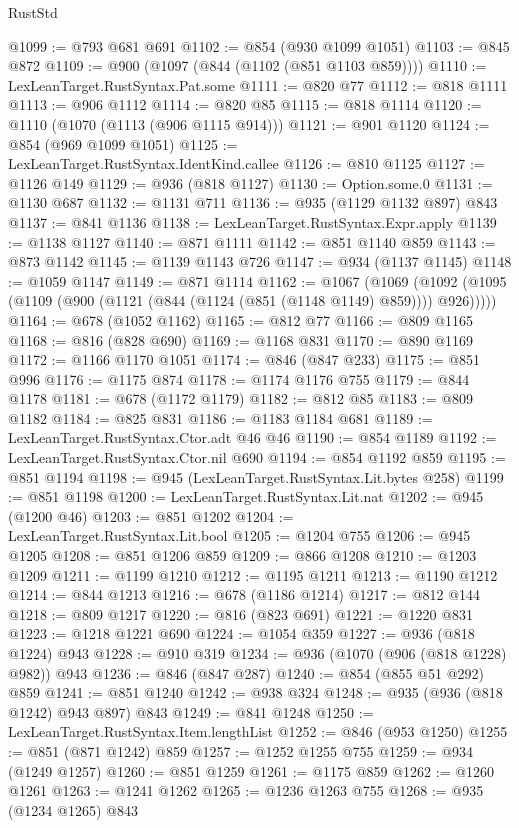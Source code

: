 \begin{lexlean}{RustStd}
\begin{coremodule}
@1099 := @793 @681 @691
@1102 := @854 (@930 @1099 @1051)
@1103 := @845 @872
@1109 := @900 (@1097 (@844 (@1102 (@851 @1103 @859))))
@1110 := LexLeanTarget.RustSyntax.Pat.some
@1111 := @820 @77
@1112 := @818 @1111
@1113 := @906 @1112
@1114 := @820 @85
@1115 := @818 @1114
@1120 := @1110 (@1070 (@1113 (@906 @1115 @914)))
@1121 := @901 @1120
@1124 := @854 (@969 @1099 @1051)
@1125 := LexLeanTarget.RustSyntax.IdentKind.callee
@1126 := @810 @1125
@1127 := @1126 @149
@1129 := @936 (@818 @1127)
@1130 := Option.some.{0}
@1131 := @1130 @687
@1132 := @1131 @711
@1136 := @935 (@1129 @1132 @897) @843
@1137 := @841 @1136
@1138 := LexLeanTarget.RustSyntax.Expr.apply
@1139 := @1138 @1127
@1140 := @871 @1111
@1142 := @851 @1140 @859
@1143 := @873 @1142
@1145 := @1139 @1143 @726
@1147 := @934 (@1137 @1145)
@1148 := @1059 @1147
@1149 := @871 @1114
@1162 := @1067
    (@1069 (@1092 (@1095 (@1109 (@900 (@1121 (@844 (@1124 (@851 (@1148 @1149) @859)))) @926)))))
@1164 := @678 (@1052 @1162)
@1165 := @812 @77
@1166 := @809 @1165
@1168 := @816 (@828 @690)
@1169 := @1168 @831
@1170 := @890 @1169
@1172 := @1166 @1170 @1051
@1174 := @846 (@847 @233)
@1175 := @851 @996
@1176 := @1175 @874
@1178 := @1174 @1176 @755
@1179 := @844 @1178
@1181 := @678 (@1172 @1179)
@1182 := @812 @85
@1183 := @809 @1182
@1184 := @825 @831
@1186 := @1183 @1184 @681
@1189 := LexLeanTarget.RustSyntax.Ctor.adt @46 @46
@1190 := @854 @1189
@1192 := LexLeanTarget.RustSyntax.Ctor.nil @690
@1194 := @854 @1192 @859
@1195 := @851 @1194
@1198 := @945 (LexLeanTarget.RustSyntax.Lit.bytes @258)
@1199 := @851 @1198
@1200 := LexLeanTarget.RustSyntax.Lit.nat
@1202 := @945 (@1200 @46)
@1203 := @851 @1202
@1204 := LexLeanTarget.RustSyntax.Lit.bool
@1205 := @1204 @755
@1206 := @945 @1205
@1208 := @851 @1206 @859
@1209 := @866 @1208
@1210 := @1203 @1209
@1211 := @1199 @1210
@1212 := @1195 @1211
@1213 := @1190 @1212
@1214 := @844 @1213
@1216 := @678 (@1186 @1214)
@1217 := @812 @144
@1218 := @809 @1217
@1220 := @816 (@823 @691)
@1221 := @1220 @831
@1223 := @1218 @1221 @690
@1224 := @1054 @359
@1227 := @936 (@818 @1224) @943
@1228 := @910 @319
@1234 := @936 (@1070 (@906 (@818 @1228) @982)) @943
@1236 := @846 (@847 @287)
@1240 := @854 (@855 @51 @292) @859
@1241 := @851 @1240
@1242 := @938 @324
@1248 := @935 (@936 (@818 @1242) @943 @897) @843
@1249 := @841 @1248
@1250 := LexLeanTarget.RustSyntax.Item.lengthList
@1252 := @846 (@953 @1250)
@1255 := @851 (@871 @1242) @859
@1257 := @1252 @1255 @755
@1259 := @934 (@1249 @1257)
@1260 := @851 @1259
@1261 := @1175 @859
@1262 := @1260 @1261
@1263 := @1241 @1262
@1265 := @1236 @1263 @755
@1268 := @935 (@1234 @1265) @843

\end{coremodule}
\end{lexlean}
